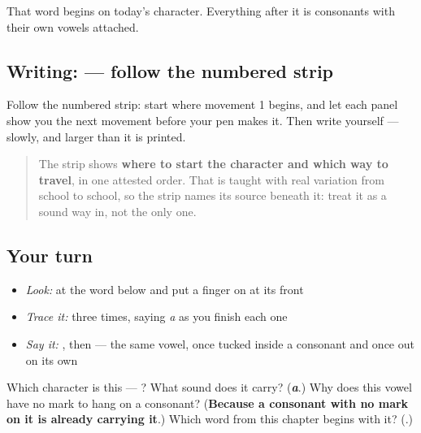 That word begins on today's character. Everything after it is consonants with their own vowels attached.

\subsection*{Writing:  — follow the numbered strip}

Follow the numbered strip: start where movement 1 begins, and let each panel show you the next movement before your pen makes it. Then write  yourself — slowly, and larger than it is printed.

\begin{quote}
The strip shows \textbf{where to start the character and which way to travel}, in one attested order. That is taught with real variation from school to school, so the strip names its source beneath it: treat it as a sound way in, not the only one.
\end{quote}

\subsection*{Your turn}
\begin{itemize}
\raggedright
  \item \emph{Look:} at the word below and put a finger on  at its front
\end{itemize}

\begin{quote}
\end{quote}

\begin{itemize}
\raggedright
  \item \emph{Trace it:}  three times, saying \emph{a} as you finish each one
  \item \emph{Say it:} , then  — the same vowel, once tucked inside a consonant and once out on its own
\end{itemize}

\begin{tcolorbox}[breakable,colback=teal!4,colframe=teal!35!black,title={Before you move on}]
Which character is this — ? What sound does it carry? (\emph{\textbf{a}}.) Why does this vowel have no mark to hang on a consonant? (\textbf{Because a consonant with no mark on it is already carrying it}.) Which word from this chapter begins with it? (\textbf{}.)
\end{tcolorbox}
